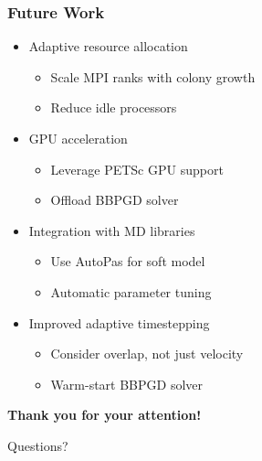 \documentclass[
	10pt,
	t
]{beamer}
\begin{document}
\begin{frame}
    \frametitle{Future Work}

    \begin{itemize}
        \item Adaptive resource allocation
              \begin{itemize}
                  \item Scale MPI ranks with colony growth
                  \item Reduce idle processors
              \end{itemize}
        \item GPU acceleration
              \begin{itemize}
                  \item Leverage PETSc GPU support
                  \item Offload BBPGD solver
              \end{itemize}
        \item Integration with MD libraries
              \begin{itemize}
                  \item Use AutoPas for soft model
                  \item Automatic parameter tuning
              \end{itemize}
        \item Improved adaptive timestepping
              \begin{itemize}
                  \item Consider overlap, not just velocity
                  \item Warm-start BBPGD solver
              \end{itemize}
    \end{itemize}

\end{frame}

\begin{frame}
    \begin{center}
        \vspace{1cm}
        {\large \textbf{Thank you for your attention!}}

        \vspace{2cm}

        \Huge{Questions?}
    \end{center}
\end{frame}

\appendix
\end{document}
